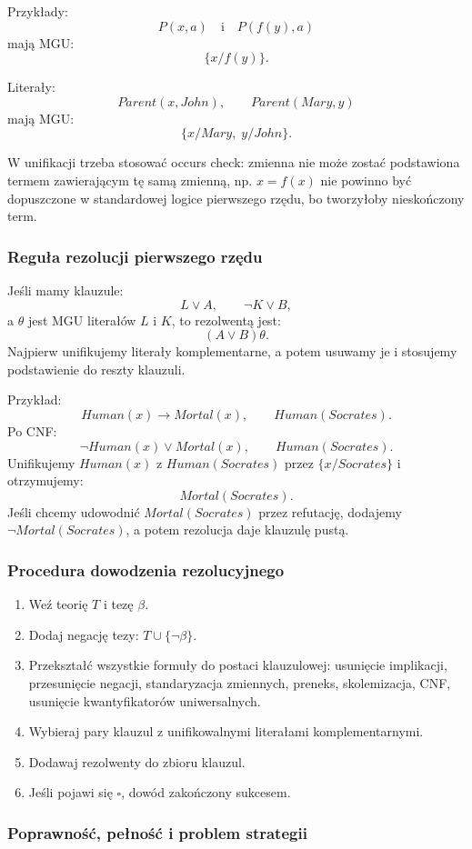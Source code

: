 Przykłady:
\[
P(x,a)\quad\text{i}\quad P(f(y),a)
\]
mają MGU:
\[
\{x/f(y)\}.
\]

Literały:
\[
Parent(x,John),\qquad Parent(Mary,y)
\]
mają MGU:
\[
\{x/Mary,\;y/John\}.
\]

W unifikacji trzeba stosować occurs check: zmienna nie może zostać podstawiona termem zawierającym tę samą zmienną, np. $x=f(x)$ nie powinno być dopuszczone w standardowej logice pierwszego rzędu, bo tworzyłoby nieskończony term.

\subsubsection{Reguła rezolucji pierwszego rzędu}

Jeśli mamy klauzule:
\[
L\vee A,\qquad \neg K\vee B,
\]
a $\theta$ jest MGU literałów $L$ i $K$, to rezolwentą jest:
\[
(A\vee B)\theta.
\]
Najpierw unifikujemy literały komplementarne, a potem usuwamy je i stosujemy podstawienie do reszty klauzuli.

Przykład:
\[
Human(x)\to Mortal(x),\qquad Human(Socrates).
\]
Po CNF:
\[
\neg Human(x)\vee Mortal(x),\qquad Human(Socrates).
\]
Unifikujemy $Human(x)$ z $Human(Socrates)$ przez $\{x/Socrates\}$ i otrzymujemy:
\[
Mortal(Socrates).
\]
Jeśli chcemy udowodnić $Mortal(Socrates)$ przez refutację, dodajemy $\neg Mortal(Socrates)$, a potem rezolucja daje klauzulę pustą.

\subsubsection{Procedura dowodzenia rezolucyjnego}

\begin{enumerate}
  \item Weź teorię $T$ i tezę $\beta$.
  \item Dodaj negację tezy: $T\cup\{\neg\beta\}$.
  \item Przekształć wszystkie formuły do postaci klauzulowej:
  usunięcie implikacji, przesunięcie negacji, standaryzacja zmiennych, preneks, skolemizacja, CNF, usunięcie kwantyfikatorów uniwersalnych.
  \item Wybieraj pary klauzul z unifikowalnymi literałami komplementarnymi.
  \item Dodawaj rezolwenty do zbioru klauzul.
  \item Jeśli pojawi się $\square$, dowód zakończony sukcesem.
\end{enumerate}

\subsubsection{Poprawność, pełność i problem strategii}

